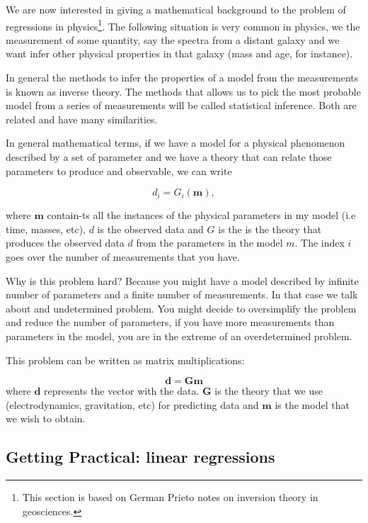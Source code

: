 \documentclass{article}
\begin{document}
We are now interested in giving a mathematical background to the problem of regressions in physics\footnote{This section is based on German Prieto notes on inversion theory in geosciences.}. 
The following situation is very common in physics, we the measurement of some quantity, say the spectra from a distant galaxy and we want infer other physical properties in that galaxy (mass and age, for instance).

In general the methods to infer the properties of a model from the measurements is known as inverse theory. The methods that allows us to pick the most probable model from a series of measurements will be called statistical inference. Both are related and have many similarities.

In general mathematical terms, if we have a model for a physical phenomenon described by a set of parameter and we have a theory that can relate those parameters to produce and observable, we can write

\begin{equation}
d_{i} = G_i (\mathbf{m}),
\end{equation}

where ${\mathbf m}$ contain-ts all the instances of the physical parameters in my model (i.e time, masses, etc), $d$ is the observed data and $G$ is the is the theory that produces the observed data $d$ from the parameters in the model $m$. The index $i$ goes over the number of measurements that you have.

Why is this problem hard? Because you might have a model described by infinite number of parameters and a finite number of measurements. In that case we talk about and undetermined problem. You might decide to oversimplify the problem and reduce the number of parameters, if you have more measurements than parameters in the model, you are in the extreme of an overdetermined problem.

This problem can be written as matrix multiplications:


\begin{equation}
\mathbf{d} = \mathbf{G}\mathbf{m}
\end{equation}
where $\mathbf{d}$ represents the vector with the data. $\mathbf{G}$ is the theory that we use (electrodynamics, gravitation, etc) for predicting data and $\mathbf{m}$ is the model that we wish to obtain.


\subsection{Getting Practical: linear regressions}
\end{document}
